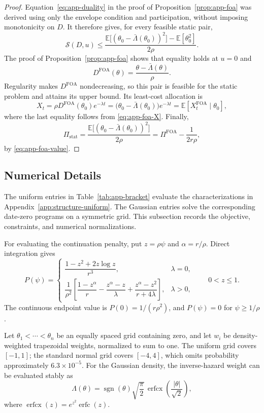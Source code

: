 \documentclass[12pt]{article}
\newcommand{\E}{\mathbb{E}}
\begin{document}
\begin{proof}
Equation~\eqref{eq:app-duality} in the proof of
Proposition~\ref{prop:app-foa} was derived using only the envelope
condition and participation, without imposing monotonicity on \(D\).
It therefore gives, for every feasible static pair,
\[
  \mathcal S(D,u)
  \leq
  \frac{
    \E\big[(\theta_0-\bar\Lambda(\theta_0))^2\big]
    -\E[\theta_0^2]
  }{2\rho}.
\]
The proof of Proposition~\ref{prop:app-foa} shows that equality holds at \(u=0\) and
\[
  D^{\mathrm{FOA}}(\theta)
  =
  \frac{\theta-\bar\Lambda(\theta)}{\rho}.
\]
Regularity makes \(D^{\mathrm{FOA}}\) nondecreasing, so this pair is
feasible for the static problem and attains its upper bound. Its
least-cost allocation is
\[
  X_t
  =
  \rho D^{\mathrm{FOA}}(\theta_0)e^{-\lambda t}
  =
  \bigl(\theta_0-\bar\Lambda(\theta_0)\bigr)e^{-\lambda t}
  =
  \E[X_t^{\mathrm{FOA}}\mid\theta_0],
\]
where the last equality follows from \eqref{eq:app-foa-X}. Finally,
\[
  \Pi_{\mathrm{stat}}
  =
  \frac{\E\big[(\theta_0-\bar\Lambda(\theta_0))^2\big]}{2\rho}
  =
  \Pi^{\mathrm{FOA}}-\frac{1}{2r\rho},
\]
by \eqref{eq:app-foa-value}.
\end{proof}

\subsection{Numerical Details}
\label{app:numerics-details}

The uniform entries in Table~\ref{tab:app-bracket} evaluate the
characterizations in Appendix~\ref{app:structure-uniform}. The
Gaussian entries solve the corresponding date-zero programs on a
symmetric grid. This subsection records the objective, constraints,
and numerical normalizations.

For evaluating the continuation penalty, put \(z=\rho\psi\) and
\(\alpha=r/\rho\). Direct integration gives
\begin{equation}\label{eq:app-P-closed}
  P(\psi)=
  \begin{cases}
    \dfrac{1-z^2+2z\log z}{r^3},
       &\lambda=0,\\[8pt]
    \dfrac1{\rho^2}\left[
       \dfrac{1-z^\alpha}{r}
       -\dfrac{z^\alpha-z}{\lambda}
       +\dfrac{z^\alpha-z^2}{r+4\lambda}
    \right],&\lambda>0,
  \end{cases}
  \qquad 0<z\leq1 .
\end{equation}
The continuous endpoint value is \(P(0)=1/(r\rho^2)\), and
\(P(\psi)=0\) for \(\psi\geq1/\rho\).

Let \(\theta_1<\cdots<\theta_n\) be an equally spaced grid containing
zero, and let \(w_i\) be density-weighted trapezoidal weights, normalized
to sum to one. The uniform grid covers \([-1,1]\); the standard normal
grid covers \([-4,4]\), which omits probability approximately
\(6.3\times10^{-5}\). For the Gaussian density, the inverse-hazard
weight can be evaluated stably as
\[
  \Lambda(\theta)
   =\operatorname{sgn}(\theta)\sqrt{\frac\pi2}\,
        \operatorname{erfcx}\left(\frac{|\theta|}{\sqrt2}\right),
\]
where \(\operatorname{erfcx}(z)=e^{z^2}\operatorname{erfc}(z)\).
\end{document}
